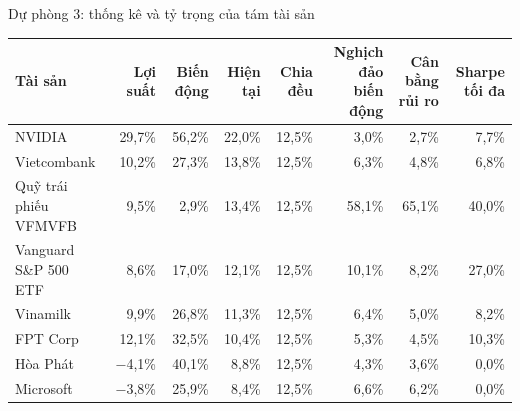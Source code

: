 \documentclass[aspectratio=169,10pt]{beamer}
\begin{document}
\begin{frame}{Dự phòng 3: thống kê và tỷ trọng của tám tài sản}
  \centering\scriptsize\setlength{\tabcolsep}{3pt}
  \begin{tabular}{@{}lrrrrrrr@{}}
    \toprule
    Tài sản & Lợi suất & Biến động & Hiện tại & Chia đều & Nghịch đảo biến động & Cân bằng rủi ro & Sharpe tối đa \\
    \midrule
    NVIDIA & 29,7\% & 56,2\% & 22,0\% & 12,5\% & 3,0\% & 2,7\% & 7,7\% \\
    Vietcombank & 10,2\% & 27,3\% & 13,8\% & 12,5\% & 6,3\% & 4,8\% & 6,8\% \\
    Quỹ trái phiếu VFMVFB & 9,5\% & 2,9\% & 13,4\% & 12,5\% & 58,1\% & 65,1\% & 40,0\% \\
    Vanguard S\&P 500 ETF & 8,6\% & 17,0\% & 12,1\% & 12,5\% & 10,1\% & 8,2\% & 27,0\% \\
    Vinamilk & 9,9\% & 26,8\% & 11,3\% & 12,5\% & 6,4\% & 5,0\% & 8,2\% \\
    FPT Corp & 12,1\% & 32,5\% & 10,4\% & 12,5\% & 5,3\% & 4,5\% & 10,3\% \\
    Hòa Phát & −4,1\% & 40,1\% & 8,8\% & 12,5\% & 4,3\% & 3,6\% & 0,0\% \\
    Microsoft & −3,8\% & 25,9\% & 8,4\% & 12,5\% & 6,6\% & 6,2\% & 0,0\% \\
    \bottomrule
  \end{tabular}

  \vspace{4pt}
\end{frame}
\end{document}
